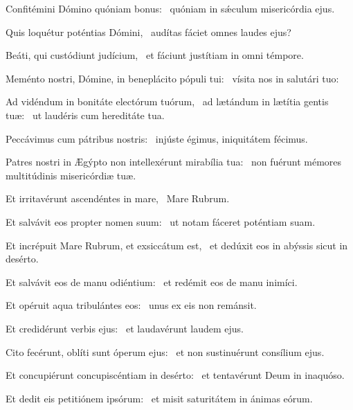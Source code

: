 \item Confitémini Dómino quóniam bonus:~\psstar{} quóniam in sǽculum misericórdia ejus.

\item Quis loquétur poténtias Dómini,~\psstar{} audítas fáciet omnes laudes ejus?

\item Beáti, qui custódiunt judícium,~\psstar{} et fáciunt justítiam in omni témpore.

\item Meménto nostri, Dómine, in beneplácito pópuli tui:~\psstar{} vísita nos in salutári tuo:

\item Ad vidéndum in bonitáte electórum tuórum,~\pscross{} ad lætándum in lætítia gentis tuæ:~\psstar{} ut laudéris cum hereditáte tua.

\item Peccávimus cum pátribus nostris:~\psstar{} injúste égimus, iniquitátem fécimus.

\item Patres nostri in Ægýpto non intellexérunt mirabília tua:~\psstar{} non fuérunt mémores multitúdinis misericórdiæ tuæ.

\item Et irritavérunt ascendéntes in mare,~\psstar{} Mare Rubrum.

\item Et salvávit eos propter nomen suum:~\psstar{} ut notam fáceret poténtiam suam.

\item Et incrépuit Mare Rubrum, et exsiccátum est,~\psstar{} et dedúxit eos in abýssis sicut in desérto.

\item Et salvávit eos de manu odiéntium:~\psstar{} et redémit eos de manu inimíci.

\item Et opéruit aqua tribulántes eos:~\psstar{} unus ex eis non remánsit.

\item Et credidérunt verbis ejus:~\psstar{} et laudavérunt laudem ejus.

\item Cito fecérunt, oblíti sunt óperum ejus:~\psstar{} et non sustinuérunt consílium ejus.

\item Et concupiérunt concupiscéntiam in desérto:~\psstar{} et tentavérunt Deum in inaquóso.

\item Et dedit eis petitiónem ipsórum:~\psstar{} et misit saturitátem in ánimas eórum.

